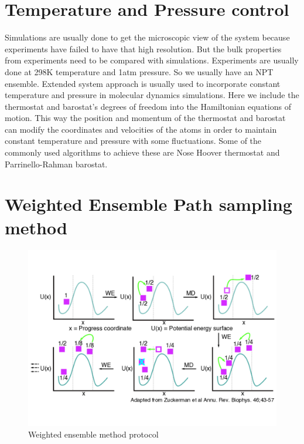 \section{Temperature and Pressure control}
Simulations are usually done to get the microscopic view of the system 
because experiments have failed to have that high resolution.
But the bulk properties from experiments need to be compared with simulations.
Experiments are usually done at 298K temperature and 1atm pressure.
So we usually have an NPT ensemble.
Extended system approach is usually used to incorporate constant temperature and pressure
in molecular dynamics simulations. Here we include the thermostat and barostat's degrees of freedom 
into the Hamiltonian equations of motion. This way the position and momentum of the thermostat and barostat can modify the coordinates and velocities of the atoms in order to maintain constant temperature and pressure 
with some fluctuations. Some of the commonly used algorithms to achieve these are Nose Hoover thermostat and Parrinello-Rahman barostat. \cite{RahmanParrinello2007,Stoll1978,Brooks1995,Klein1994}


\section{Weighted Ensemble Path sampling method}
\begin{figure}
    \centering
    \includegraphics[width=1.0\textwidth]{chapter1_figs/we_pic.png}
    \caption{Weighted ensemble method protocol}
    \label{fig:we_fig}
\end{figure}

